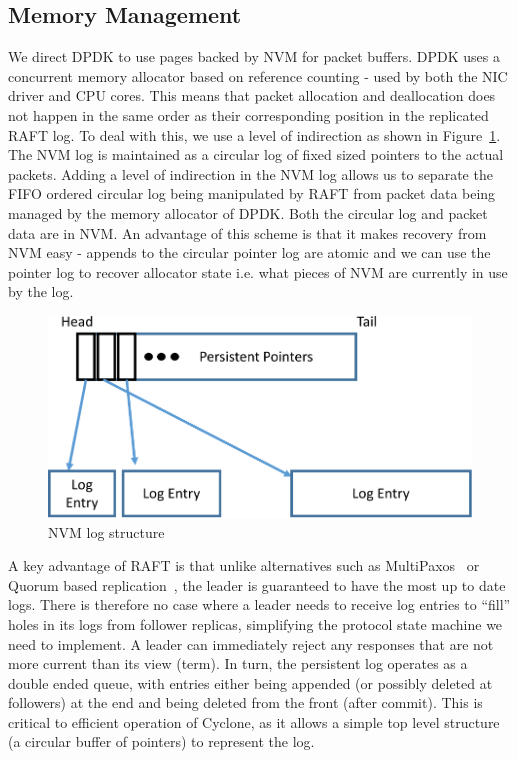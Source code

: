 \documentclass[pageno]{jpaper}
\begin{document}
\subsection{Memory Management}
\label{sec:mm}
We direct DPDK to use pages backed by NVM for packet buffers. DPDK uses a
concurrent memory allocator based on reference counting - used by both the NIC
driver and CPU cores. This means that packet allocation and deallocation does
not happen in the same order as their corresponding position in the replicated
RAFT log. To deal with this, we use a level of indirection as shown in
Figure~\ref{fig:nvm_log}. The NVM log is maintained as a circular log of fixed
sized pointers to the actual packets. Adding a level of indirection in the NVM
log allows us to separate the FIFO ordered circular log being manipulated by
RAFT from packet data being managed by the memory allocator of DPDK. Both the
circular log and packet data are in NVM. An advantage of this scheme is that it
makes recovery from NVM easy - appends to the circular pointer log are atomic
and we can use the pointer log to recover allocator state i.e. what pieces of
NVM are currently in use by the log.

\begin{figure}
\centering
\includegraphics[scale=0.3]{figures2/nvm_log.pdf}
\caption{NVM log structure}
\label{fig:nvm_log}
\end{figure}

A key advantage of RAFT is that unlike alternatives such as
MultiPaxos~\cite{multipaxos} or Quorum based replication~\cite{quorum}, the
leader is guaranteed to have the most up to date logs. There is therefore no
case where a leader needs to receive log entries to ``fill'' holes in its logs
from follower replicas, simplifying the protocol state machine we need to
implement. A leader can immediately reject any responses that are not more
current than its view (term). In turn, the persistent log operates as a double
ended queue, with entries either being appended (or possibly deleted at
followers) at the end and being deleted from the front (after commit). This is
critical to efficient operation of Cyclone, as it allows a simple top level
structure (a circular buffer of pointers) to represent the log.
\end{document}
